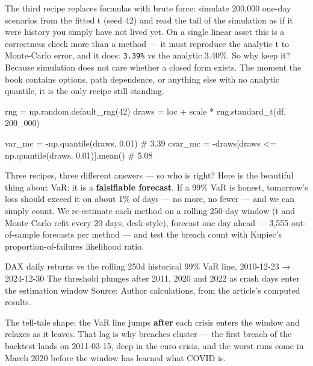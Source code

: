 \documentclass{pyportfolios-note}
\begin{document}
\noteneedroom{170bp}

The third recipe replaces formulas with brute force: simulate 200,000 one-day
scenarios from the fitted t (seed 42) and read the tail of the simulation as if
it were history you simply have not lived yet. On a single linear asset this is a
correctness check more than a method — it must reproduce the analytic t to
Monte-Carlo error, and it does: \texttt{3.39\%} vs the analytic 3.40\%. So why
keep it? Because simulation does not care whether a closed form exists. The
moment the book contains options, path dependence, or anything else with no
analytic quantile, it is the only recipe still standing.

\begin{notecode}
rng = np.random.default_rng(42)
draws = loc + scale * rng.standard_t(df, 200_000)

var_mc  = -np.quantile(draws, 0.01)             # 3.39%
cvar_mc = -draws[draws <= np.quantile(draws, 0.01)].mean()   # 5.08%
\end{notecode}

\noteneedroom{190bp}

Three recipes, three different answers — so who is right? Here is the beautiful
thing about VaR: it is a \textbf{falsifiable forecast}. If a 99\% VaR is honest,
tomorrow's loss should exceed it on about 1\% of days — no more, no fewer — and
we can simply count. We re-estimate each method on a rolling 250-day window (t
and Monte Carlo refit every 20 days, desk-style), forecast one day ahead — 3,555
out-of-sample forecasts per method — and test the breach count with Kupiec's
proportion-of-failures likelihood ratio.

  {DAX daily returns vs the rolling 250d historical 99\% VaR line, 2010-12-23 → 2024-12-30}
  {The threshold plunges after 2011, 2020 and 2022 as crash days enter the
   estimation window}
  {Source: Author calculations, from the article's computed results.}

The tell-tale shape: the VaR line jumps \textbf{after} each crisis enters the
window and relaxes as it leaves. That lag is why breaches cluster — the first
breach of the backtest lands on 2011-03-15, deep in the euro crisis, and the
worst runs come in March 2020 before the window has learned what COVID is.
\end{document}
